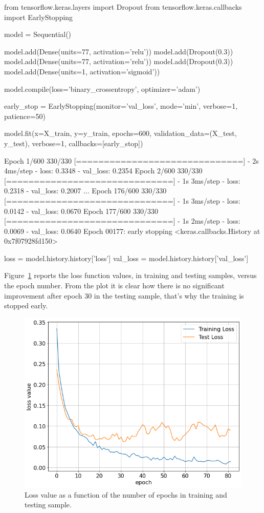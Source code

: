 \begin{ipython}
from tensorflow.keras.layers import Dropout
from tensorflow.keras.callbacks import EarlyStopping
	
model = Sequential()
	
model.add(Dense(units=77, activation='relu'))
model.add(Dropout(0.3))
model.add(Dense(units=77, activation='relu'))
model.add(Dropout(0.3))
model.add(Dense(units=1, activation='sigmoid'))
	
model.compile(loss='binary_crossentropy', optimizer='adam')
	
early_stop = EarlyStopping(monitor='val_loss', 
                           mode='min', 
                           verbose=1, 
                           patience=50)
	
model.fit(x=X_train, y=y_train,
          epochs=600,
          validation_data=(X_test, y_test), 
          verbose=1, callbacks=[early_stop])
\end{ipython}
\begin{ioutput}
Epoch 1/600
330/330 [==============================] - 2s 4ms/step - loss: 0.3348 
- val_loss: 0.2354
Epoch 2/600
330/330 [==============================] - 1s 3ms/step - loss: 0.2318 
- val_loss: 0.2007
...
Epoch 176/600
330/330 [==============================] - 1s 3ms/step - loss: 0.0142 - val_loss: 0.0670
Epoch 177/600
330/330 [==============================] - 1s 2ms/step - loss: 0.0069 - val_loss: 0.0640
Epoch 00177: early stopping
<keras.callbacks.History at 0x7f07928fd150>
\end{ioutput}

\begin{ipython}
loss = model.history.history['loss']
val_loss = model.history.history['val_loss']
\end{ipython}

Figure~\ref{fig:bankruptcy_loss} reports the loss function values, in training and testing samples, versus the epoch number. From the plot it is clear how there is no significant improvement after epoch 30 in the testing sample, that's why the training is stopped early.

\begin{figure}[htbp]
\centering
\includegraphics[width=0.7\linewidth]{figures/bankruptcy_loss}
\caption{Loss value as a function of the number of epochs in training and testing sample.}
\label{fig:bankruptcy_loss}
\end{figure}

